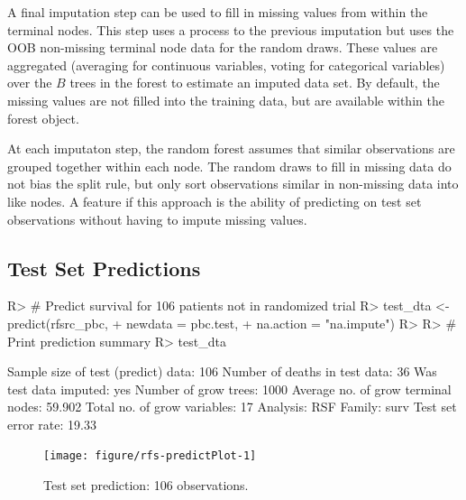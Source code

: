 \documentclass[nojss]{jss}\usepackage[]{graphicx}\usepackage[]{color}
\begin{document}
A final imputation step can be used to fill in missing values from within the terminal nodes. This step uses a process to the previous imputation but uses the OOB non-missing terminal node data for the random draws. These values are aggregated (averaging for continuous variables, voting for categorical variables) over the $B$ trees in the forest to estimate an imputed data set. By default, the missing values are not filled into the training data, but are available within the forest object.

At each imputaton step, the random forest assumes that similar observations are grouped together within each node. The random draws to fill in missing data do not bias the split rule, but only sort observations similar in non-missing data into like nodes. A feature if this approach is the ability of predicting on test set observations without having to impute missing values. 

\subsection{Test Set Predictions}

\begin{Schunk}
\begin{Sinput}
R> # Predict survival for 106 patients not in randomized trial
R> test_dta <- predict(rfsrc_pbc, 
+                     newdata = pbc.test,
+                     na.action = "na.impute")
R> 
R> # Print prediction summary  
R> test_dta
\end{Sinput}
\begin{Soutput}
  Sample size of test (predict) data: 106
       Number of deaths in test data: 36
               Was test data imputed: yes
                Number of grow trees: 1000
  Average no. of grow terminal nodes: 59.902
         Total no. of grow variables: 17
                            Analysis: RSF
                              Family: surv
                 Test set error rate: 19.33%
\end{Soutput}
\end{Schunk}

\begin{Schunk}
\begin{figure}[!htpb]

{\centering \texttt{[image: figure/rfs-predictPlot-1]} 

}

\caption[Test set prediction]{Test set prediction: 106 observations.\label{fig:predictPlot}}
\end{figure}
\end{Schunk}
\end{document}
